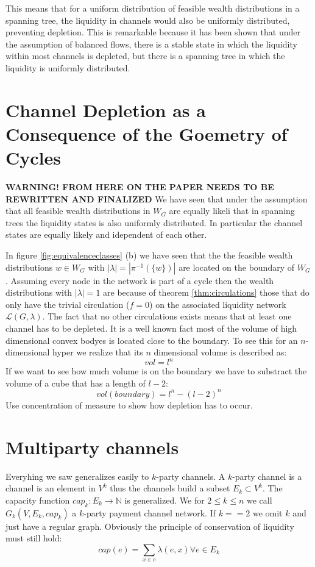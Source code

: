 \documentclass[10pt,twocolumn]{article}
\begin{document}
This means that for a uniform distribution of feasible wealth distributions in a spanning tree, the liquidity in channels would also be uniformly distributed, preventing depletion. This is remarkable because it has been shown \cite{guidi2019steadystate} that under the assumption of balanced flows, there is a stable state in which the liquidity within most channels is depleted, but there is a spanning tree in which the liquidity is uniformly distributed.

\section{Channel Depletion as a Consequence of the Goemetry of Cycles}
\textbf{WARNING! FROM HERE ON THE PAPER NEEDS TO BE REWRITTEN AND FINALIZED}
We have seen that under the assumption that all feasible wealth distributions in $W_G$ are equally likeli that in spanning trees the liquidity states is also uniformly distributed.
In particular the channel states are equally likely and idependent of each other.

In figure \ref{fig:equivalenceclasses} (b) we have seen that the the feasible wealth distributions $w\in W_G$ with $|\lambda|=|\pi^{-1}(\{w\})|$ are located on the boundary of $W_G$.
Assuming every node in the network is part of a cycle then the wealth distributions with $|\lambda|=1$ are because of theorem \ref{thm:circulations} those that do only have the trivial circulation ($f=0$) on the associated liquidity network $\mathcal{L}(G,\lambda)$.
The fact that no other circulations exists means that at least one channel has to be depleted. 
It is a well known fact most of the volume of high dimensional convex bodyes is located close to the boundary.
To see this for an $n$-dimensional hyper we realize that its $n$ dimensional volume is described as:
$$vol = l^n$$
If we want to see how much volume is on the boundary we have to substract the volume of a cube that has a length of $l-2$:
$$vol(boundary) = l^n - (l-2)^n$$
Use concentration of measure to show how depletion has to occur. 

\section{Multiparty channels}
Everyhing we saw generalizes easily to $k$-party channels.
A $k$-party channel is a channel is an element in $V^k$ thus the channels build a subset $E_k\subset V^k$.
The capacity function $cap_k:E_k\longrightarrow \mathbb{N}$ is generalized.
We for $2\leq k\leq n$ we call $G_k(V,E_k,cap_k)$ a $k$-party payment channel network.
If $k==2$ we omit $k$ and just have a regular graph.
Obviously the principle of conservation of liquidity must still hold:
\begin{equation}
cap(e)=\sum_{x\in e}\lambda(e,x) \forall e\in E_k
\end{equation}
\end{document}
